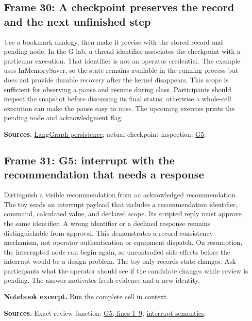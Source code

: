 \documentclass[11pt]{article}
\begin{document}
\subsection*{Frame 30: A checkpoint preserves the record and the next unfinished step}
Use a bookmark analogy, then make it precise with the stored record and pending node. In the G lab, a thread identifier associates the checkpoint with a particular execution. That identifier is not an operator credential. The example uses InMemorySaver, so the state remains available in the running process but does not provide durable recovery after the kernel disappears. This scope is sufficient for observing a pause and resume during class. Participants should inspect the snapshot before discussing its final status; otherwise a whole-cell execution can make the pause easy to miss. The upcoming exercise prints the pending node and acknowledgment flag.\par
\par\nopagebreak\begin{minipage}{\linewidth}{\footnotesize\color{slate}\textbf{Sources.} \href{https://docs.langchain.com/oss/python/langgraph/persistence}{LangGraph persistence}; actual checkpoint inspection: \href{../Graph_Workflow_Lab.ipynb}{G5}.\par}\end{minipage}\par\medskip
\subsection*{Frame 31: G5: interrupt with the recommendation that needs a response}
Distinguish a visible recommendation from an acknowledged recommendation. The toy sends an interrupt payload that includes a recommendation identifier, command, calculated value, and declared scope. Its scripted reply must approve the same identifier. A wrong identifier or a declined response remains distinguishable from approval. This demonstrates a record-consistency mechanism, not operator authentication or equipment dispatch. On resumption, the interrupted node can begin again, so uncontrolled side effects before the interrupt would be a design problem. The toy only records state changes. Ask participants what the operator should see if the candidate changes while review is pending. The answer motivates fresh evidence and a new identity.\par
\par\noindent\begin{minipage}{\linewidth}\textbf{Notebook excerpt.} Run the complete cell in context.\par \end{minipage}\par
\par\nopagebreak\begin{minipage}{\linewidth}{\footnotesize\color{slate}\textbf{Sources.} Exact review function: \href{../Graph_Workflow_Lab.ipynb}{G5, lines 1--9}; \href{https://docs.langchain.com/oss/python/langgraph/interrupts}{interrupt semantics}.\par}\end{minipage}\par\medskip
\end{document}
